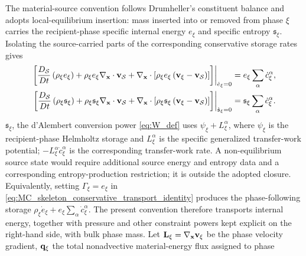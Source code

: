 The material-source convention follows Drumheller's constituent balance and
adopts local-equilibrium insertion: mass inserted into or removed from phase
\(\xi\) carries the recipient-phase specific internal energy \(e_\xi\) and
specific entropy \(\mathfrak{s}_\xi\).  Isolating the source-carried parts of the
corresponding conservative storage rates gives
%
\begin{subequations}
	\label{eq:MC_local_equilibrium_mass_source_closure}
	\begin{align}
		\left.
		\left[
			\frac{D_{\mathcal{S}}}{Dt}
			\left(
			\rho_\xi e_\xi
			\right)
			+
			\rho_\xi e_\xi
			\nabla_{\mathbf{x}}\cdot\mathbf{v}_{\mathcal{S}}
			+
			\nabla_{\mathbf{x}}\cdot
			\left[
				\rho_\xi e_\xi
				\left(
				\mathbf{v}_\xi-\mathbf{v}_{\mathcal{S}}
				\right)
			\right]
		\right]
		\right\vert_{\dot e_\xi=0}
		 & =
		e_\xi\sum_\alpha\dot c_\xi^\alpha,
		\label{eq:MC_local_equilibrium_mass_source_energy} \\
		\left.
		\left[
			\frac{D_{\mathcal{S}}}{Dt}
			\left(
			\rho_\xi\mathfrak{s}_\xi
			\right)
			+
			\rho_\xi\mathfrak{s}_\xi
			\nabla_{\mathbf{x}}\cdot\mathbf{v}_{\mathcal{S}}
			+
			\nabla_{\mathbf{x}}\cdot
			\left[
				\rho_\xi\mathfrak{s}_\xi
				\left(
				\mathbf{v}_\xi-\mathbf{v}_{\mathcal{S}}
				\right)
			\right]
		\right]
		\right\vert_{\dot{\mathfrak{s}}_\xi=0}
		 & =
		\mathfrak{s}_\xi
		\sum_\alpha\dot c_\xi^\alpha .
		\label{eq:MC_local_equilibrium_mass_source_entropy}
	\end{align}
\end{subequations}
%
\(\mathfrak{s}_\xi\), the d'Alembert conversion power
\eqref{eq:W_def} uses \(\psi_\xi+L_\xi^\alpha\), where \(\psi_\xi\) is the
recipient-phase Helmholtz storage and \(L_\xi^\alpha\) is the specific
generalized transfer-work potential; \(-L_\xi^\alpha\dot c_\xi^\alpha\) is
the corresponding transfer-work rate.  A non-equilibrium source state would
require additional source energy and entropy data and a corresponding
entropy-production restriction; it is outside the adopted closure.
Equivalently, setting \(\Gamma_\xi=e_\xi\) in
\eqref{eq:MC_skeleton_conservative_transport_identity} produces the
phase-following storage
\(\rho_\xi\dot e_\xi+e_\xi\sum_\alpha\dot c_\xi^\alpha\).  The present
convention therefore transports internal energy, together with pressure and
other constraint powers kept explicit on the right-hand side, with bulk phase
mass.  Let
\(\mathbf{L}_\xi=\nabla_{\mathbf{x}}\mathbf{v}_\xi\) be the phase velocity gradient,
\(\mathbf{q}_\xi\) the total nonadvective material-energy flux assigned to phase
